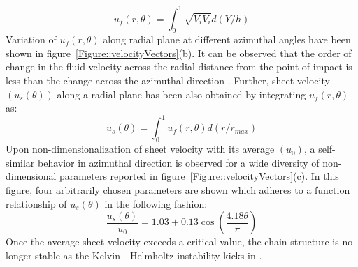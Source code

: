 \documentclass{jfm}
\begin{document}
\begin{equation}\label{Equation::uf}
u_f(r,\theta) = \int_{0}^{1}\sqrt{V_iV_i}d(Y/h)
\end{equation}
Variation of $u_f(r,\theta)$ along radial plane at different azimuthal angles have been shown in figure~\ref{Figure::velocityVectors}(b). It can be observed that the order of change in the fluid velocity across the radial distance from the point of impact is less than the change across the azimuthal direction \citep{choo2002velocity}. Further, sheet velocity $\left(u_s(\theta)\right)$ along a radial plane has been also obtained by integrating $u_f(r,\theta)$ as: %
\begin{equation}\label{Equation::us}
u_s(\theta) = \int_{0}^{1}u_f(r,\theta)d(r/r_{max})
\end{equation} 
Upon non-dimensionalization of sheet velocity with its average $\left(u_0\right)$, a self-similar behavior in azimuthal direction is observed for a wide diversity of non-dimensional parameters reported in figure~\ref{Figure::velocityVectors}(c). In this figure, four arbitrarily chosen parameters are shown which adheres to a function relationship of $u_s(\theta)$ in the following fashion: 
\begin{equation}\label{Equation::usu0}
\frac{u_s(\theta)}{u_0} = 1.03 + 0.13\cos\left(\frac{4.18\theta}{\pi}\right)
\end{equation}
Once the average sheet velocity exceeds a critical value, the chain structure is no longer stable as the  Kelvin - Helmholtz instability kicks in \citep{villermaux2002life}. \\
\end{document}
